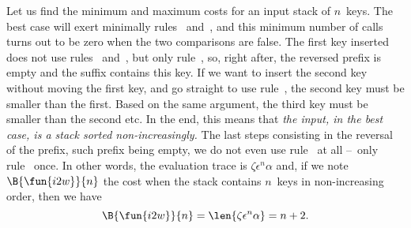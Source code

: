 
Let us find the minimum and maximum costs for an input stack of
\(n\)~keys. The best case will exert minimally rules
\clause{\sigma}~and~\clause{\tau}, and this minimum number of calls
turns out to be zero when the two comparisons are false. The first key
inserted does not use rules \clause{\sigma}~and~\clause{\tau}, but
only rule~\clause{\upsilon}, so, right after, the reversed prefix is
empty and the suffix contains this key. If we want to insert the
second key without moving the first key, and go straight to use
rule~\clause{\upsilon}, the second key must be smaller than the
first. Based on the same argument, the third key must be smaller than
the second etc. In the end, this means that \emph{the input, in the
  best case, is a stack sorted non\hyp{}increasingly.} The last steps
consisting in the reversal of the prefix, such prefix being empty, we
do not even use rule~\clause{\rho} at all --~only rule~\clause{\pi}
once. In other words, the evaluation trace is
\(\zeta\epsilon^n\alpha\) and, if we note \(\B{\fun{i2w}}{n}\) the
cost when the stack contains \(n\)~keys in non\hyp{}increasing order,
then we have
\begin{equation*}
\B{\fun{i2w}}{n} = \len{\zeta\epsilon^n\alpha} = n + 2.
\end{equation*}

